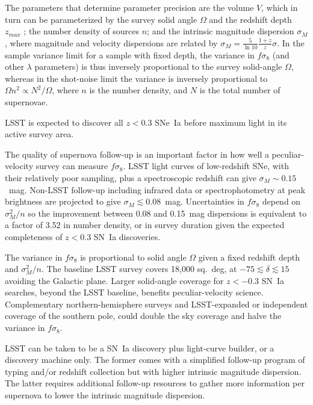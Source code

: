 \documentclass{aastex62}   	%
\begin{document}
The parameters that determine parameter precision are the volume $V$, which
in turn can be parameterized by the survey solid angle $\Omega$ and the redshift depth $z_{max}$ ; the number density of sources $n$; and the intrinsic
magnitude dispersion $\sigma_M$, where magnitude and velocity dispersions are related by $\sigma_{M} = \frac{5}{\ln{10}} \frac{1+z}{z} \sigma$.
In the sample variance limit for a sample with fixed depth, the variance in $f\sigma_8$ (and other $\lambda$ parameters)
is thus inversely proportional to the survey solid-angle $\Omega$, whereas
in the shot-noise limit the variance is inversely proportional to $\Omega n^2 \propto N^2/\Omega$, where $n$ is the number density,
and $N$ is the total number of supernovae.  

LSST is expected to discover all $z<0.3$ SNe~Ia before maximum light in its active survey area.


The quality of supernova follow-up is an important factor in how well a peculiar-velocity survey can measure $f\sigma_8$.
LSST light curves of low-redshift SNe, with their relatively poor sampling, plus a spectroscopic redshift
 can give $\sigma_M \sim 0.15$~mag. Non-LSST follow-up including infrared data or spectrophotometry at peak brightness are projected to give
$\sigma_M \lesssim 0.08$~mag.
Uncertainties in $f\sigma_8$ depend on $\sigma^2_M/n$ so the improvement between 0.08 and 0.15~mag dispersions is equivalent to a factor of 3.52
 in number density, or in survey duration given the expected completeness of $z<0.3$ SN~Ia discoveries.

The variance in $f\sigma_8$ is proportional to solid angle $\Omega$ given a fixed redshift depth and  $\sigma^2_M/n$.  The baseline
LSST survey covers 18,000 sq.~deg, at $-75 \lesssim \delta \lesssim15$ avoiding the Galactic plane.  Larger solid-angle coverage for $z<-0.3$ SN~Ia searches, beyond
the LSST baseline, benefits peculiar-velocity science.  Complementary northern-hemisphere surveys and LSST-expanded or independent
coverage of the southern pole, could double
the sky coverage and halve the variance in $f\sigma_8$.

LSST can be taken to be a SN~Ia discovery plus light-curve builder, or a discovery machine only.  The former comes with a simplified follow-up program of typing
and/or redshift collection but with higher intrinsic magnitude dispersion.  The latter requires additional follow-up resources to gather more information per supernova to
lower the intrinsic magnitude dispersion.

\appendix
\end{document}
